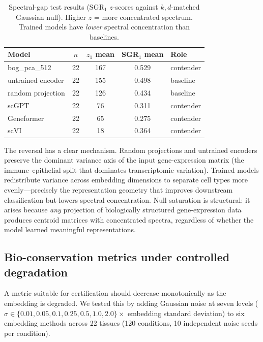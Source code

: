 \documentclass[11pt]{article}
\begin{document}
\begin{table}[t]
\centering
\caption{Spectral-gap test results (SGR$_1$ $z$-scores against
$k,d$-matched Gaussian null). Higher $z$ = more concentrated spectrum.
Trained models have \emph{lower} spectral concentration than
baselines.}
\label{tab:sgr}
\small
\begin{tabular}{@{}lcccl@{}}
\toprule
Model & $n$ & $z_1$ mean & SGR$_1$ mean & Role \\
\midrule
bog\_pca\_512           & 22 & 167 & 0.529 & contender \\
untrained encoder       & 22 & 155 & 0.498 & baseline \\
random projection       & 22 & 126 & 0.434 & baseline \\
scGPT                   & 22 & 76  & 0.311 & contender \\
Geneformer              & 22 & 65  & 0.275 & contender \\
scVI                    & 22 & 18  & 0.364 & contender \\
\bottomrule
\end{tabular}
\end{table}

The reversal has a clear mechanism. Random projections and untrained
encoders preserve the dominant variance axis of the input gene-expression
matrix (the immune--epithelial split that dominates transcriptomic
variation). Trained models redistribute variance across embedding
dimensions to separate cell types more evenly---precisely the
representation geometry that improves downstream classification but
lowers spectral concentration. Null saturation is structural: it
arises because \emph{any} projection of biologically structured
gene-expression data produces centroid matrices with concentrated
spectra, regardless of whether the model learned meaningful
representations.


\subsection{Bio-conservation metrics under controlled degradation}
\label{sec:noise}

A metric suitable for certification should decrease monotonically as the
embedding is degraded. We tested this by adding Gaussian noise at seven
levels ($\sigma \in \{0.01, 0.05, 0.1, 0.25, 0.5, 1.0, 2.0\} \times$
embedding standard deviation) to six embedding methods across 22
tissues (120 conditions, 10 independent noise seeds per condition).
\end{document}
